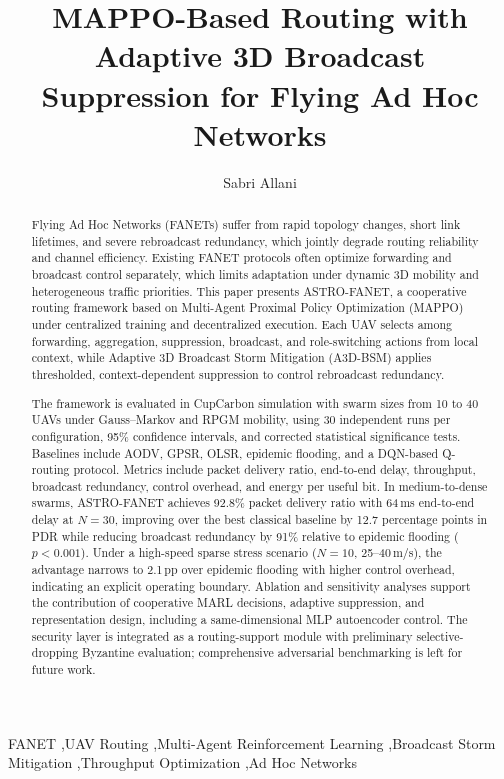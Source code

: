 \documentclass[5p,times]{elsarticle}
\def\corref#1{}%
\begin{document}
\begin{frontmatter}

\title{MAPPO-Based Routing with Adaptive 3D Broadcast Suppression for Flying Ad Hoc Networks}

\author[inst1]{Sabri Allani\corref{cor1}}
\address[inst1]{ENSI, University of Manouba, Manouba 2010, Tunisia}

\begin{abstract}
\sloppy
Flying Ad Hoc Networks (FANETs) suffer from rapid topology changes, short link lifetimes, and severe rebroadcast redundancy, which jointly degrade routing reliability and channel efficiency. Existing FANET protocols often optimize forwarding and broadcast control separately, which limits adaptation under dynamic 3D mobility and heterogeneous traffic priorities. This paper presents ASTRO-FANET, a cooperative routing framework based on Multi-Agent Proximal Policy Optimization (MAPPO) under centralized training and decentralized execution. Each UAV selects among forwarding, aggregation, suppression, broadcast, and role-switching actions from local context, while Adaptive 3D Broadcast Storm Mitigation (A3D-BSM) applies thresholded, context-dependent suppression to control rebroadcast redundancy.

The framework is evaluated in CupCarbon simulation with swarm sizes from 10 to 40 UAVs under Gauss--Markov and RPGM mobility, using 30 independent runs per configuration, 95\% confidence intervals, and corrected statistical significance tests. Baselines include AODV, GPSR, OLSR, epidemic flooding, and a DQN-based Q-routing protocol. Metrics include packet delivery ratio, end-to-end delay, throughput, broadcast redundancy, control overhead, and energy per useful bit. In medium-to-dense swarms, ASTRO-FANET achieves 92.8\% packet delivery ratio with 64\,ms end-to-end delay at $N=30$, improving over the best classical baseline by 12.7 percentage points in PDR while reducing broadcast redundancy by 91\% relative to epidemic flooding ($p < 0.001$). Under a high-speed sparse stress scenario ($N=10$, 25--40\,m/s), the advantage narrows to 2.1\,pp over epidemic flooding with higher control overhead, indicating an explicit operating boundary. Ablation and sensitivity analyses support the contribution of cooperative MARL decisions, adaptive suppression, and representation design, including a same-dimensional MLP autoencoder control. The security layer is integrated as a routing-support module with preliminary selective-dropping Byzantine evaluation; comprehensive adversarial benchmarking is left for future work.
\fussy
\end{abstract}

\begin{keyword}
FANET \sep UAV Routing \sep Multi-Agent Reinforcement Learning \sep Broadcast Storm Mitigation \sep Throughput Optimization \sep Ad Hoc Networks
\end{keyword}

\end{frontmatter}
\end{document}
